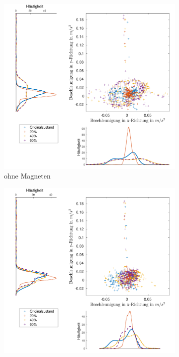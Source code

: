 \begin{figure}[htb]
	\centering
	\begin{adjustwidth}{-0.2\linewidth}{-0.2\linewidth}
		\hspace{+45pt}
		\begin{subfigure}[c]{.45\linewidth}
			\centering
			\includegraphics[width=\linewidth]{Bilder/Beschleunigung_Grund_20_40_60_ohneM.pdf}
			\caption{ohne Magneten}
			\vspace{5pt}
		\end{subfigure}
		\hspace{-25pt}
		\begin{subfigure}[c]{.45\linewidth}
			\centering
			\includegraphics[width=\linewidth]{Bilder/Beschleunigung_Grund_20_40_60_mitM.pdf}

\end{subfigure}
\end{adjustwidth}
\end{figure}
